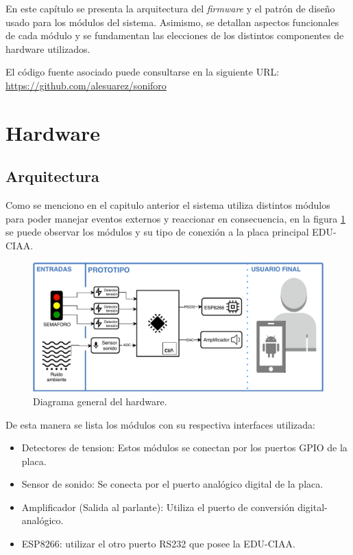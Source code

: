 En este capítulo se presenta la arquitectura del \textit{firmware} y el patrón de diseño usado para los módulos del sistema. Asimismo, se detallan aspectos funcionales de cada módulo y se fundamentan las elecciones de los distintos componentes de hardware utilizados.

El código fuente asociado puede consultarse en la siguiente URL:
\url{https://github.com/alesuarez/soniforo}


\section{Hardware}
\subsection{Arquitectura}
Como se menciono en el capitulo anterior el sistema utiliza distintos módulos para poder manejar eventos externos y reaccionar en consecuencia, en la figura \ref{fig:diagramaGeneralHardware} se puede observar los módulos y su tipo de conexión a la placa principal EDU-CIAA.

\begin{figure}[h]
	\centering
	\includegraphics[scale=.7]{./Figures/diagramaGeneralHardware.pdf}
	\caption{Diagrama general del hardware.}
	\label{fig:diagramaGeneralHardware}
\end{figure}

De esta manera se lista los módulos con su respectiva interfaces utilizada:

\begin{itemize}
	\item Detectores de tension: Estos módulos se conectan por los puertos GPIO de la placa.
	\item Sensor de sonido: Se conecta por el puerto analógico digital de la placa.
	\item Amplificador (Salida al parlante): Utiliza el puerto de conversión digital-analógico.
	\item ESP8266: utilizar el otro puerto RS232 que posee la EDU-CIAA.
\end{itemize}

